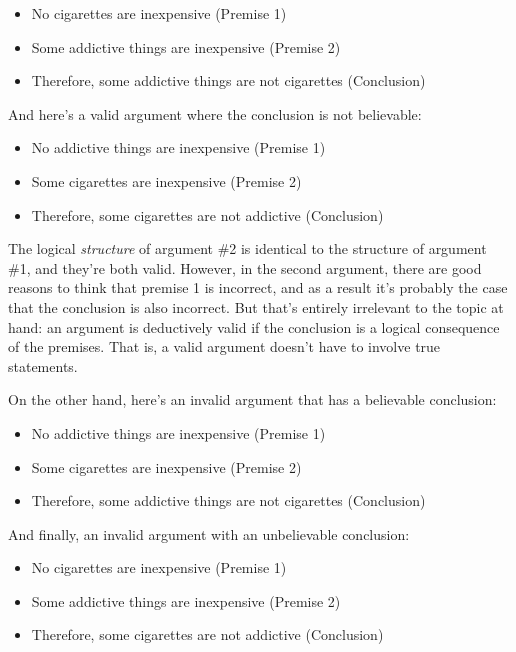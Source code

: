 \documentclass[
]{book}
\providecommand{\tightlist}{%
  \setlength{\itemsep}{0pt}\setlength{\parskip}{0pt}}
\begin{document}
\begin{itemize}
\tightlist
\item
  No cigarettes are inexpensive (Premise 1)
\item
  Some addictive things are inexpensive (Premise 2)
\item
  Therefore, some addictive things are not cigarettes (Conclusion)
\end{itemize}

And here's a valid argument where the conclusion is not believable:

\begin{itemize}
\tightlist
\item
  No addictive things are inexpensive (Premise 1)
\item
  Some cigarettes are inexpensive (Premise 2)
\item
  Therefore, some cigarettes are not addictive (Conclusion)
\end{itemize}

The logical \emph{structure} of argument \#2 is identical to the structure of argument \#1, and they're both valid. However, in the second argument, there are good reasons to think that premise 1 is incorrect, and as a result it's probably the case that the conclusion is also incorrect. But that's entirely irrelevant to the topic at hand: an argument is deductively valid if the conclusion is a logical consequence of the premises. That is, a valid argument doesn't have to involve true statements.

On the other hand, here's an invalid argument that has a believable conclusion:

\begin{itemize}
\tightlist
\item
  No addictive things are inexpensive (Premise 1)
\item
  Some cigarettes are inexpensive (Premise 2)
\item
  Therefore, some addictive things are not cigarettes (Conclusion)
\end{itemize}

And finally, an invalid argument with an unbelievable conclusion:

\begin{itemize}
\tightlist
\item
  No cigarettes are inexpensive (Premise 1)
\item
  Some addictive things are inexpensive (Premise 2)
\item
  Therefore, some cigarettes are not addictive (Conclusion)
\end{itemize}
\end{document}

